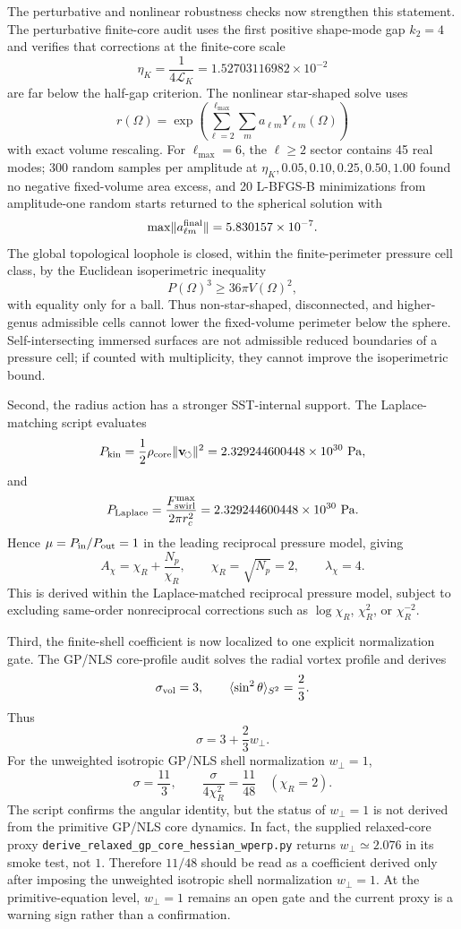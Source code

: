 \documentclass[aps,pra,preprint,longbibliography,nofootinbib]{revtex4-2}
\begin{document}
The perturbative and nonlinear robustness checks now strengthen this statement.
The perturbative finite-core audit uses the first positive shape-mode gap
\(k_2=4\) and verifies that corrections at the finite-core scale
\[
  \eta_K=\frac{1}{4\mathcal L_K}=1.52703116982\times10^{-2}
\]
are far below the half-gap criterion.  The nonlinear star-shaped solve uses
\[
  r(\Omega)=\exp\!\left(\sum_{\ell=2}^{\ell_{\max}}\sum_m
  a_{\ell m}Y_{\ell m}(\Omega)\right)
\]
with exact volume rescaling.  For \(\ell_{\max}=6\), the
\(\ell\ge2\) sector contains 45 real modes; 300 random samples per amplitude
at \(\eta_K,0.05,0.10,0.25,0.50,1.00\) found no negative fixed-volume area
excess, and 20 L-BFGS-B minimizations from amplitude-one random starts returned
to the spherical solution with
\[
  \max\lVert a_{\ell m}^{\rm final}\rVert=5.830157\times10^{-7}.
\]
The global topological loophole is closed, within the finite-perimeter pressure
cell class, by the Euclidean isoperimetric inequality
\[
  P(\Omega)^3\ge 36\pi V(\Omega)^2,
\]
with equality only for a ball.  Thus non-star-shaped, disconnected, and
higher-genus admissible cells cannot lower the fixed-volume perimeter below the
sphere.  Self-intersecting immersed surfaces are not admissible reduced
boundaries of a pressure cell; if counted with multiplicity, they cannot
improve the isoperimetric bound.


Second, the radius action has a stronger SST-internal support.  The
Laplace-matching script evaluates
\[
  P_{\rm kin}=\frac12\rho_{\rm core}
  \lVert\mathbf v_{\!\boldsymbol{\circlearrowleft}}\rVert^2
  =
  2.329244600448\times10^{30}\ {\rm Pa},
\]
and
\[
  P_{\rm Laplace}=\frac{F_{\rm swirl}^{\max}}{2\pi r_c^2}
  =
  2.329244600448\times10^{30}\ {\rm Pa}.
\]
Hence \(\mu=P_{\rm in}/P_{\rm out}=1\) in the leading reciprocal pressure
model, giving
\[
  A_\chi=\chi_R+\frac{N_p}{\chi_R},
  \qquad
  \chi_R=\sqrt{N_p}=2,
  \qquad
  \lambda_\chi=4 .
\]
This is derived within the Laplace-matched reciprocal pressure model, subject
to excluding same-order nonreciprocal corrections such as \(\log\chi_R\),
\(\chi_R^2\), or \(\chi_R^{-2}\).

Third, the finite-shell coefficient is now localized to one explicit
normalization gate.  The GP/NLS core-profile audit solves the radial vortex
profile and derives
\[
  \sigma_{\rm vol}=3,
  \qquad
  \langle\sin^2\theta\rangle_{S^2}=\frac23.
\]
Thus
\[
  \sigma=3+\frac23 w_\perp .
\]
For the unweighted isotropic GP/NLS shell normalization \(w_\perp=1\),
\[
  \sigma=\frac{11}{3},
  \qquad
  \frac{\sigma}{4\chi_R^2}=\frac{11}{48}
  \quad(\chi_R=2).
\]
The script confirms the angular identity, but the status of \(w_\perp=1\) is
not derived from the primitive GP/NLS core dynamics.  In fact, the supplied
relaxed-core proxy \texttt{derive\_relaxed\_gp\_core\_hessian\_wperp.py}
returns \(w_\perp\simeq2.076\) in its smoke test, not \(1\).  Therefore
\(11/48\) should be read as a coefficient derived only after imposing the
unweighted isotropic shell normalization \(w_\perp=1\).  At the
primitive-equation level, \(w_\perp=1\) remains an open gate and the current
proxy is a warning sign rather than a confirmation.
\end{document}
